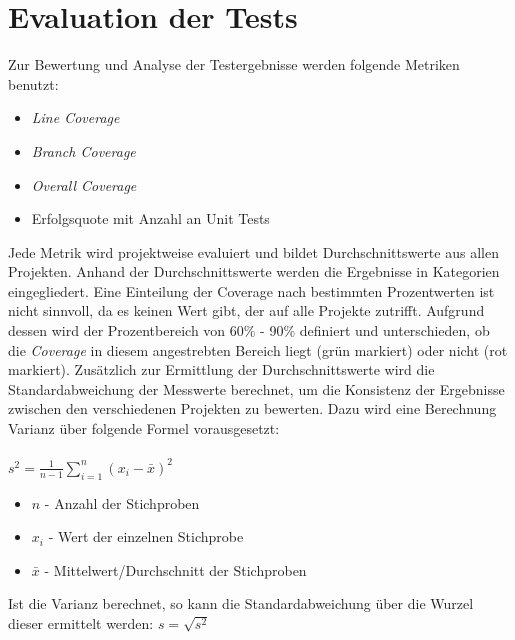 \section{Evaluation der Tests}\label{section:eval}
Zur Bewertung und Analyse der Testergebnisse werden folgende Metriken benutzt: 
\begin{itemize}
    \setlength{\parskip}{1pt}
    \item \textit{Line Coverage}
    \item \textit{Branch Coverage}
    \item \textit{Overall Coverage}
    \item Erfolgsquote mit Anzahl an Unit Tests
\end{itemize}
Jede Metrik wird projektweise evaluiert und bildet Durchschnittswerte aus allen Projekten. Anhand der Durchschnittswerte werden die Ergebnisse in Kategorien eingegliedert. Eine Einteilung der Coverage nach bestimmten Prozentwerten ist nicht sinnvoll, da es keinen Wert gibt, der auf alle Projekte zutrifft. Aufgrund dessen wird der Prozentbereich von 60\% - 90\% definiert und unterschieden, ob die \textit{Coverage} in diesem angestrebten Bereich liegt (grün markiert) oder nicht (rot markiert). \cite{WhatReasonableCode} Zusätzlich zur Ermittlung der Durchschnittswerte wird die Standardabweichung der Messwerte berechnet, um die Konsistenz der Ergebnisse zwischen den verschiedenen Projekten zu bewerten. Dazu wird eine Berechnung  Varianz über folgende Formel vorausgesetzt:\\\\
$s^2 = \frac{1}{n-1} \displaystyle\sum_{i=1}^{n} (x_i - \bar{x})^2$
\begin{itemize}
    \setlength{\parskip}{1pt}
    \item $n$ - Anzahl der Stichproben
    \item $x_i$ - Wert der einzelnen Stichprobe
    \item $\bar{x}$ - Mittelwert/Durchschnitt der Stichproben
\end{itemize}
Ist die Varianz berechnet, so kann die Standardabweichung über die Wurzel dieser ermittelt werden: 
$s=\sqrt{s^2}$


